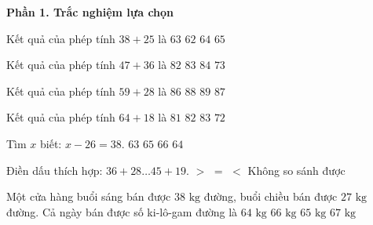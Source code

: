 \textbf{Phần 1. Trắc nghiệm lựa chọn}

\begin{ex} %
Kết quả của phép tính $38 + 25$ là
\choice
{\True $63$}
{$62$}
{$64$}
{$65$}
\end{ex}

\begin{ex} %
Kết quả của phép tính $47 + 36$ là
\choice
{$82$}
{\True $83$}
{$84$}
{$73$}
\end{ex}

\begin{ex} %
Kết quả của phép tính $59 + 28$ là
\choice
{$86$}
{$88$}
{$89$}
{\True $87$}
\end{ex}

\begin{ex} %
Kết quả của phép tính $64 + 18$ là
\choice
{$81$}
{\True $82$}
{$83$}
{$72$}
\end{ex}

\begin{ex} %
Tìm $x$ biết: $x - 26 = 38$.
\choice
{$63$}
{$65$}
{$66$}
{\True $64$}
\end{ex}

\begin{ex} %
Điền dấu thích hợp: $36 + 28 \dots 45 + 19$.
\choice
{$>$}
{\True $=$}
{$<$}
{Không so sánh được}
\end{ex}

\begin{ex} %
Một cửa hàng buổi sáng bán được $38\text{ kg}$ đường, buổi chiều bán được $27\text{ kg}$ đường. Cả ngày bán được số ki-lô-gam đường là
\choice
{$64\text{ kg}$}
{$66\text{ kg}$}
{\True $65\text{ kg}$}
{$67\text{ kg}$}
\end{ex}

